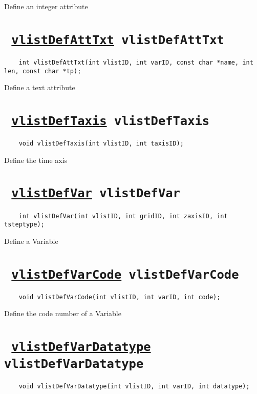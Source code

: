 Define an integer attribute
\ifpdfoutput{}{(\ref{vlistDefAttInt})}


\section*{\tt 
\ifpdf
\hyperref[vlistDefAttTxt]{vlistDefAttTxt}
\else
vlistDefAttTxt
\fi
}
\begin{verbatim}
    int vlistDefAttTxt(int vlistID, int varID, const char *name, int len, const char *tp);
\end{verbatim}

Define a text attribute
\ifpdfoutput{}{(\ref{vlistDefAttTxt})}


\section*{\tt 
\ifpdf
\hyperref[vlistDefTaxis]{vlistDefTaxis}
\else
vlistDefTaxis
\fi
}
\begin{verbatim}
    void vlistDefTaxis(int vlistID, int taxisID);
\end{verbatim}

Define the time axis
\ifpdfoutput{}{(\ref{vlistDefTaxis})}


\section*{\tt 
\ifpdf
\hyperref[vlistDefVar]{vlistDefVar}
\else
vlistDefVar
\fi
}
\begin{verbatim}
    int vlistDefVar(int vlistID, int gridID, int zaxisID, int tsteptype);
\end{verbatim}

Define a Variable
\ifpdfoutput{}{(\ref{vlistDefVar})}


\section*{\tt 
\ifpdf
\hyperref[vlistDefVarCode]{vlistDefVarCode}
\else
vlistDefVarCode
\fi
}
\begin{verbatim}
    void vlistDefVarCode(int vlistID, int varID, int code);
\end{verbatim}

Define the code number of a Variable
\ifpdfoutput{}{(\ref{vlistDefVarCode})}


\section*{\tt 
\ifpdf
\hyperref[vlistDefVarDatatype]{vlistDefVarDatatype}
\else
vlistDefVarDatatype
\fi
}
\begin{verbatim}
    void vlistDefVarDatatype(int vlistID, int varID, int datatype);
\end{verbatim}

